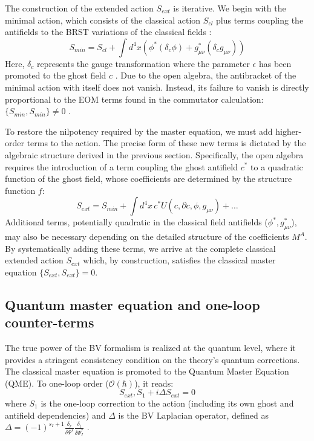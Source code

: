 \documentclass[twocolumn]{aastex631}
\begin{document}
The construction of the extended action $S_{ext}$ is iterative. We begin with the minimal action, which consists of the classical action $S_{cl}$ plus terms coupling the antifields to the BRST variations of the classical fields \citep{grigoriev1999superfieldbrstchargemaster,aidaoui2008brstexactactionn1}:
\begin{equation}
S_{min} = S_{cl} + \int d^4x \left( \phi^* (\delta_c \phi) + g_{\mu\nu}^* (\delta_c g_{\mu\nu}) \right)
\end{equation}
Here, $\delta_c$ represents the gauge transformation where the parameter $\epsilon$ has been promoted to the ghost field $c$ \citep{ohta2020generalproceduregaugefixings}. Due to the open algebra, the antibracket of the minimal action with itself does not vanish. Instead, its failure to vanish is directly proportional to the EOM terms found in the commutator calculation: $\{S_{min}, S_{min}\} \neq 0$ \citep{mckeon2024fieldredefinitioninvariantlagrange}.

To restore the nilpotency required by the master equation, we must add higher-order terms to the action. The precise form of these new terms is dictated by the algebraic structure derived in the previous section. Specifically, the open algebra requires the introduction of a term coupling the ghost antifield $c^*$ to a quadratic function of the ghost field, whose coefficients are determined by the structure function $f$:
\begin{equation}
S_{ext} = S_{min} + \int d^4x \, c^* U(c, \partial c, \phi, g_{\mu\nu}) + \dots
\end{equation}
Additional terms, potentially quadratic in the classical field antifields ($\phi^*, g_{\mu\nu}^*$), may also be necessary depending on the detailed structure of the coefficients $M^A$. By systematically adding these terms, we arrive at the complete classical extended action $S_{ext}$ which, by construction, satisfies the classical master equation $\{S_{ext}, S_{ext}\} = 0$.

\subsection{Quantum master equation and one-loop counter-terms}
The true power of the BV formalism is realized at the quantum level, where it provides a stringent consistency condition on the theory's quantum corrections. The classical master equation is promoted to the Quantum Master Equation (QME). To one-loop order ($\mathcal{O}(\hbar)$), it reads:
\begin{equation}
{S_{ext}, S_1} + i \Delta S_{ext} = 0
\end{equation}
where $S_1$ is the one-loop correction to the action (including its own ghost and antifield dependencies) \citep{fernández2023oneloopcorrectionscelestialchiral} and $\Delta$ is the BV Laplacian operator, defined as $\Delta = (-1)^{s_I+1} \frac{\delta_r}{\delta \Psi^I} \frac{\delta_l}{\delta \Psi^*_I}$ \citep{fernández2023oneloopcorrectionscelestialchiral}.
\end{document}

